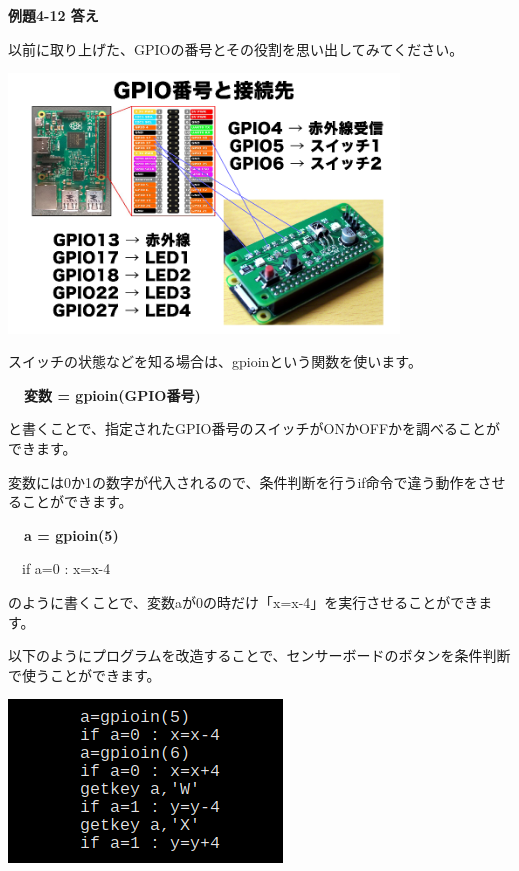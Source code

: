 \documentclass[a4paper,12pt]{jarticle}
\begin{document}
\bigskip
\bigskip
\bigskip

{\bfseries
例題4-12 答え}


\bigskip

以前に取り上げた、GPIOの番号とその役割を思い出してみてください。

\bigskip
\bigskip

\begin{minipage}{9.781cm}
\centering
{\upshape
\includegraphics[keepaspectratio,width=10.372cm,height=6.89cm]{text04-img/text04-img004.png}}
\end{minipage}

\bigskip
\bigskip
\bigskip

スイッチの状態などを知る場合は、gpioinという関数を使います。


\bigskip

{\bfseries
\ \ 変数 = gpioin(GPIO番号)}


\bigskip

と書くことで、指定されたGPIO番号のスイッチがONかOFFかを調べることができます。

変数には0か1の数字が代入されるので、条件判断を行うif命令で違う動作をさせることができます。


\bigskip

{\bfseries
\ \ a = gpioin(5)

\ \ if a=0 : x=x-4}


\bigskip

のように書くことで、変数aが0の時だけ「x=x-4」を実行させることができます。


\bigskip

以下のようにプログラムを改造することで、センサーボードのボタンを条件判断で使うことができます。

\bigskip
\bigskip

\begin{minipage}{9.781cm}
\centering
{\upshape
\includegraphics[keepaspectratio]{text04-img/text04-img038.png}}
\end{minipage}
\end{document}
